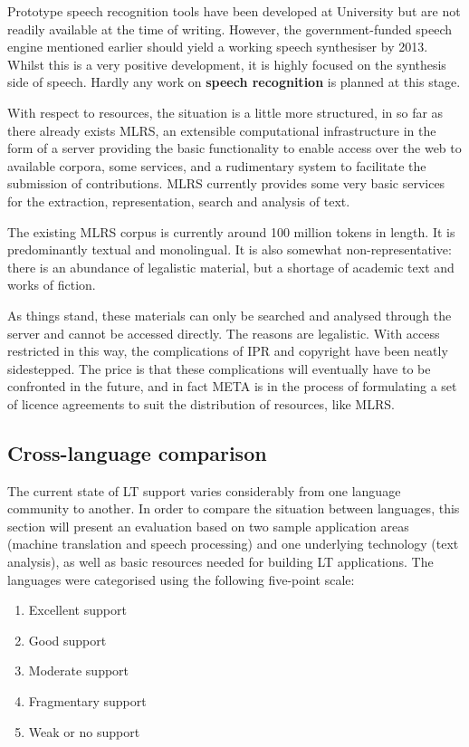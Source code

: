 \begin{multicols}{2}
Prototype speech recognition tools have been developed at University but are not readily available at the time of writing. However, the government-funded speech engine mentioned earlier should yield a working speech synthesiser by 2013. Whilst this is a very positive development, it is highly focused on the synthesis side of speech. Hardly any work on \textbf{speech recognition} is planned at this stage.

With respect to resources, the situation is a little more structured, in so far as there already exists MLRS, an extensible computational infrastructure in the form of a server providing the basic functionality to enable access over the web to available corpora, some services, and a rudimentary system to facilitate the submission of contributions. MLRS currently provides some very basic services for the extraction, representation, search and analysis of text.

The existing MLRS corpus is currently around 100 million tokens in length. It is predominantly textual and monolingual. It is also somewhat non-representative: there is an abundance of legalistic material, but a shortage of academic text and works of fiction.

As things stand, these materials can only be searched and analysed through the server and cannot be accessed directly. The reasons are legalistic. With access restricted in this way, the complications of IPR and copyright have been neatly sidestepped. The price is that these complications will eventually have to be confronted in the future, and in fact META is in the process of formulating a set of licence agreements to suit the distribution of resources, like MLRS.


\subsection{Cross-language comparison}

The current state of LT support varies considerably from one language community to another. In order to compare the situation between languages, this section will present an evaluation based on two sample application areas (machine translation and speech processing) and one underlying technology (text analysis), as well as basic resources needed for building LT applications. The languages were categorised using the following five-point scale: 

\begin{enumerate}
\item Excellent support
\item Good support
\item Moderate support
\item Fragmentary support
\item Weak or no support
\end{enumerate}


\end{multicols}

